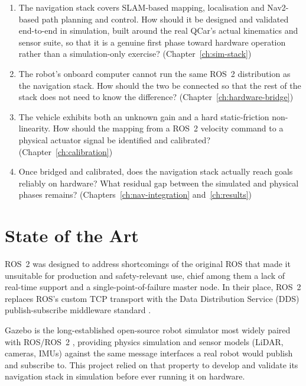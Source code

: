 \begin{enumerate}
  \item The navigation stack covers SLAM-based mapping, localisation
        and Nav2-based path planning and control. How should it be
        designed and validated end-to-end in simulation, built around
        the real QCar's actual kinematics and sensor suite, so that
        it is a genuine first phase toward hardware operation rather
        than a simulation-only exercise? (Chapter~\ref{ch:sim-stack})
  \item The robot's onboard computer cannot run the same ROS~2
        distribution as the navigation stack. How should the two be
        connected so that the rest of the stack does not need to
        know the difference? (Chapter~\ref{ch:hardware-bridge})
  \item The vehicle exhibits both an unknown gain and a hard
        static-friction non-linearity. How should the mapping from a
        ROS~2 velocity command to a physical actuator signal be
        identified and calibrated? (Chapter~\ref{ch:calibration})
  \item Once bridged and calibrated, does the navigation stack
        actually reach goals reliably on hardware? What residual gap
        between the simulated and physical phases remains?
        (Chapters~\ref{ch:nav-integration} and~\ref{ch:results})
\end{enumerate}

\section{State of the Art}
\label{sec:state-of-the-art}

ROS~2 was designed to address shortcomings of the original ROS that
made it unsuitable for production and safety-relevant use, chief
among them a lack of real-time support and a single-point-of-failure
master node. In their place, ROS~2 replaces ROS's custom TCP
transport with the Data Distribution Service (DDS) publish-subscribe
middleware standard \cite{omg2015dds,macenski2022ros2}.

Gazebo is the long-established open-source robot simulator most
widely paired with ROS/ROS~2 \cite{koenig2004gazebo}, providing
physics simulation and sensor models (LiDAR, cameras, IMUs) against
the same message interfaces a real robot would publish and subscribe
to. This project relied on that property to develop and validate its
navigation stack in simulation before ever running it on hardware.

